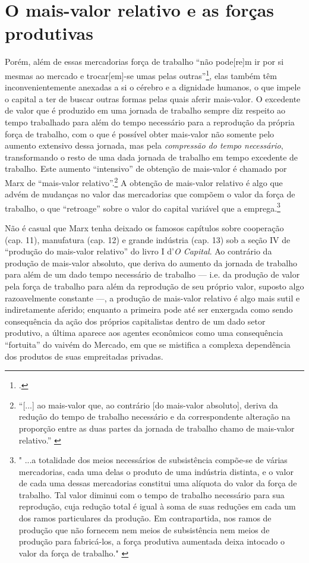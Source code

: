 \section{O mais-valor relativo e as forças produtivas}
Porém, além de essas mercadorias força de trabalho ``não pode[re]m ir por si mesmas ao mercado e trocar[em]-se umas pelas outras''\footcite[p. 159]{Marx2017}, elas também têm inconvenientemente anexadas a si o cérebro e a dignidade humanos, o que impele o capital a ter de buscar outras formas pelas quais aferir mais-valor. O excedente de valor que é produzido em uma jornada de trabalho sempre diz respeito ao tempo trabalhado para além do tempo necessário para a reprodução da própria força de trabalho, com o que é possível obter mais-valor não somente pelo aumento extensivo dessa jornada, mas pela \textit{compressão do tempo necessário}, transformando o resto de uma dada jornada de trabalho em tempo excedente de trabalho. Este aumento ``intensivo'' de obtenção de mais-valor é chamado por Marx de ``mais-valor relativo''.\footnote{``[...] ao mais-valor que, ao contrário [do mais-valor absoluto], deriva da redução do tempo de trabalho necessário e da correspondente alteração na proporção entre as duas partes da jornada de trabalho chamo de mais-valor relativo.'' \parencite[p. 390]{Marx2017}} A obtenção de mais-valor relativo é algo que advém de mudanças no valor das mercadorias que compõem o valor da força de trabalho, o que ``retroage'' sobre o valor do capital variável que a emprega.\footnote{" ...a totalidade dos meios necessários de subsistência compõe-se de várias mercadorias, cada uma delas o produto de uma indústria distinta, e o valor de cada uma dessas mercadorias constitui uma alíquota do valor da força de trabalho. Tal valor diminui com o tempo de trabalho necessário para sua reprodução, cuja redução total é igual à soma de suas reduções em cada um dos ramos particulares da produção. Em contrapartida, nos ramos de produção que não fornecem nem meios de subsistência nem meios de produção para fabricá-los, a força produtiva aumentada deixa intocado o valor da força de trabalho." \parencite[p. 390]{Marx2017}}

Não é casual que Marx tenha deixado os famosos capítulos sobre cooperação (cap. 11), manufatura (cap. 12) e grande indústria (cap. 13) sob a seção IV de ``produção do mais-valor relativo'' do livro I d'\textit{O Capital}. Ao contrário da produção de mais-valor absoluto, que deriva do aumento da jornada de trabalho para além de um dado tempo necessário de trabalho --- i.e. da produção de valor pela força de trabalho para além da reprodução de seu próprio valor, suposto algo razoavelmente constante ---, a produção de mais-valor relativo é algo mais sutil e indiretamente aferido; enquanto a primeira pode até ser enxergada como sendo consequência da ação dos próprios capitalistas dentro de um dado setor produtivo, a última aparece aos agentes econômicos como uma consequência ``fortuita'' do vaivém do Mercado, em que se mistifica a complexa dependência dos produtos de suas empreitadas privadas. 

